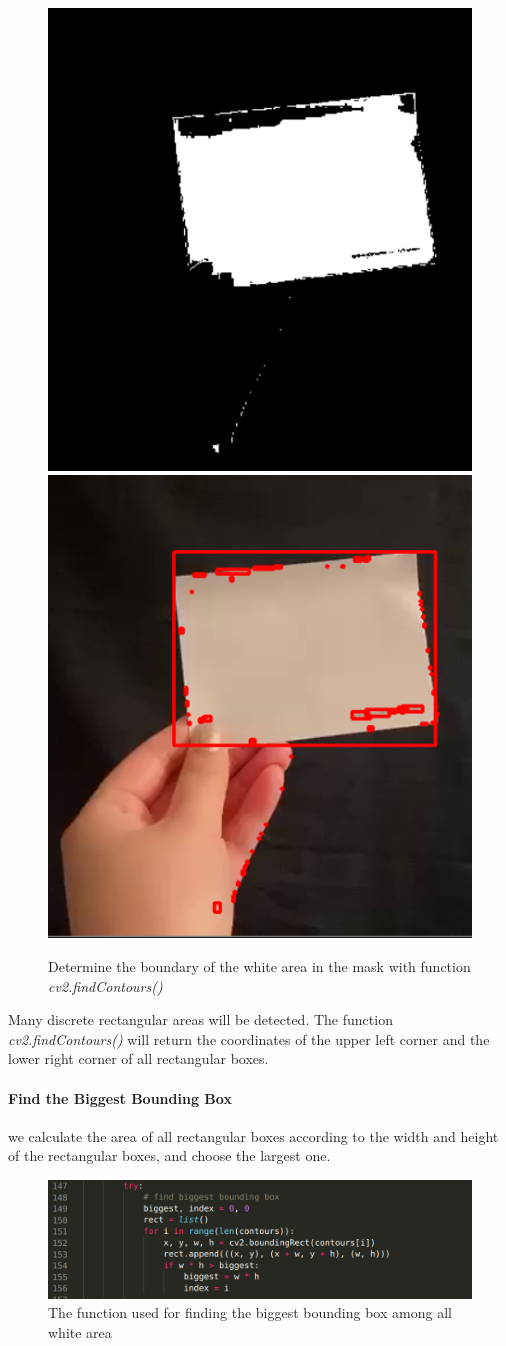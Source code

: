 \documentclass[a4paper, twoside]{report}
\begin{document}
{{\begin{figure}[h!]
\centering
\includegraphics[width=.45\textwidth]{frame.png}
\includegraphics[width=.45\textwidth]{frame1.png}
\caption{Determine the boundary of the white area in the mask with function \textit{cv2.findContours()}}
\end{figure}


\noindent Many discrete rectangular areas will be detected. The function \textit{cv2.findContours()} will return the coordinates of the upper left corner and the lower right corner of all rectangular boxes.  \\ \par

\paragraph{Find the Biggest Bounding Box} we calculate the area of all rectangular boxes according to the width and height of the rectangular boxes, and choose the largest one. \\ \par

\begin{figure}[h!]
\centering
\includegraphics[width=.9\textwidth]{code.png}
\caption{The function used for finding the biggest bounding box among all white area}
\end{figure}

}}
\end{document}
